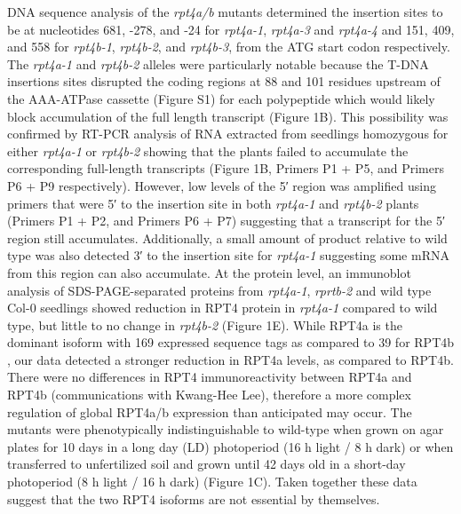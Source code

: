 DNA sequence analysis of the \textit{rpt4a/b} mutants determined the insertion sites to be at nucleotides 681, -278, and -24 for \textit{rpt4a-1}, \textit{rpt4a-3} and \textit{rpt4a-4} and 151, 409, and 558 for \textit{rpt4b-1}, \textit{rpt4b-2}, and \textit{rpt4b-3}, from the ATG start codon respectively. The \textit{rpt4a-1} and \textit{rpt4b-2} alleles were particularly notable because the T-DNA insertions sites disrupted the coding regions at 88 and 101 residues upstream of the AAA-ATPase cassette (Figure S1) for each polypeptide which would likely block accumulation of the full length transcript (Figure 1B). This possibility was confirmed by RT-PCR analysis of RNA extracted from seedlings homozygous for either \textit{rpt4a-1} or \textit{rpt4b-2} showing that the plants failed to accumulate the corresponding full-length transcripts (Figure 1B, Primers P1 + P5, and Primers P6 + P9 respectively). However, low levels of the 5′ region was amplified using primers that were 5′ to the insertion site in both \textit{rpt4a-1} and \textit{rpt4b-2} plants (Primers P1 + P2, and Primers P6 + P7) suggesting that  a transcript for the 5′ region still accumulates. Additionally, a small amount of product relative to wild type was also detected 3′ to the insertion site for \textit{rpt4a-1} suggesting some mRNA from this region can also accumulate. At the protein level, an immunoblot analysis of SDS-PAGE-separated proteins from \textit{rpt4a-1}, \textit{rprtb-2} and wild type Col-0 seedlings showed reduction in RPT4 protein in \textit{rpt4a-1} compared to wild type, but little to no change in \textit{rpt4b-2} (Figure 1E). While RPT4a is the dominant isoform with 169 expressed sequence tags as compared to 39 for RPT4b \citep{berardini15}, our data detected a stronger reduction in RPT4a levels, as compared to RPT4b. There were no differences in RPT4 immunoreactivity between RPT4a and RPT4b (communications with Kwang-Hee Lee), therefore a more complex regulation of global RPT4a/b expression than anticipated may occur.  The mutants were phenotypically indistinguishable to wild-type when grown on agar plates for 10 days in a long day (LD) photoperiod (16 h light / 8 h dark) or when transferred to unfertilized soil and grown until 42 days old in a short-day photoperiod (8 h light / 16 h dark) (Figure 1C).  Taken together these data suggest that the two RPT4 isoforms are not essential by themselves.

